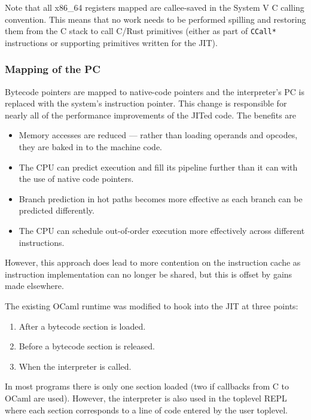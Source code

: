 Note that all x86\_64 registers mapped are callee-saved in the System V C calling convention. This
means that no work needs to be performed spilling and restoring them from the C stack to call
C/Rust
primitives (either as part of \texttt{CCall*} instructions or supporting primitives written for the
JIT).

\subsubsection{Mapping of the PC}

Bytecode pointers are mapped to native-code pointers and the interpreter's PC is replaced with the
system's instruction pointer. This change is responsible for nearly all of the performance
improvements of the JITed code. The benefits are

\begin{itemize}
      \item Memory accesses are reduced --- rather than loading operands and opcodes, they are
            baked
            in to the machine code.
      \item The CPU can predict execution and fill its pipeline further than it can with the use of
            native code pointers.
      \item Branch prediction in hot paths becomes more effective as each branch can be predicted
            differently.
      \item The CPU can schedule out-of-order execution more effectively across different
            instructions.
\end{itemize}

However, this approach does lead to more contention on the instruction cache as instruction
implementation can no longer be shared, but this is offset by gains made elsewhere.


The existing OCaml runtime was modified to hook into the JIT at three points:

\begin{enumerate}
      \item After a bytecode section is loaded.
      \item Before a bytecode section is released.
      \item When the interpreter is called.
\end{enumerate}

In most programs there is only one section loaded (two if callbacks from C to OCaml are
used). However, the interpreter is also used in the toplevel REPL where each section corresponds to
a line of code entered by the user toplevel.

